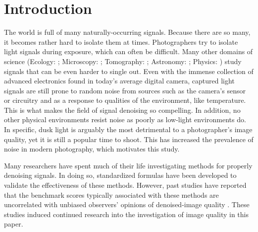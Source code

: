 \documentclass{ncjms}
\begin{document}
%

%

\date{\today}


\maketitle


%

%
%
%

\section{Introduction}
The world is full of many naturally-occurring signals. Because there are so many, it becomes rather hard to isolate them at times. Photographers try to isolate light signals during exposure, which can often be difficult. Many other domains of science (Ecology: \citealp{statespace16}; Microscopy: \citealp{perfeval16}; Tomography: \citealp{imgproctom06}; Astronomy: \citealp{1502901}; Physics: \citealp{939832}) study signals that can be even harder to single out. Even with the immense collection of advanced electronics found in today's average digital camera, captured light signals are still prone to random noise from sources such as the camera's sensor or circuitry and as a response to qualities of the environment, like temperature. This is what makes the field of signal denoising so compelling. In addition, no other physical environments resist noise as poorly as low-light environments do. In specific, dusk light is arguably the most detrimental to a photographer's image quality, yet it is still a popular time to shoot. This has increased the prevalence of noise in modern photography, which motivates this study. 

Many researchers have spent much of their life investigating methods for properly denoising signals. In doing so, standardized formulas have been developed to validate the effectiveness of these methods. However, past studies have reported that the benchmark scores typically associated with these methods are uncorrelated with unbiased observers' opinions of denoised-image quality \citep{blur, survey_blur, perf_eval}. These studies induced continued research into the investigation of image quality in this paper. 
\end{document}

